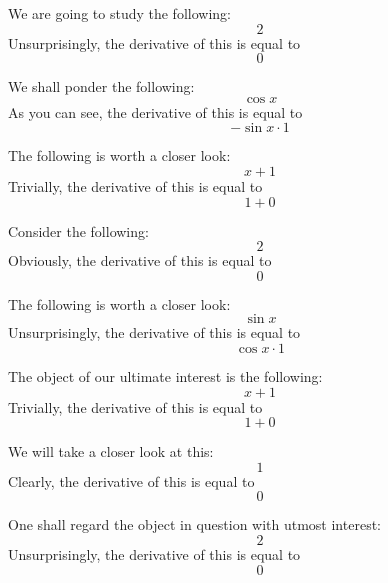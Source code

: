 \documentclass{article}
\begin{document}
We are going to study the following:
\begin{equation}
2 
\end{equation}
Unsurprisingly, the derivative of this is equal to
\begin{equation}
0 
\end{equation}

We shall ponder the following:
\begin{equation}
\cos x 
\end{equation}
As you can see, the derivative of this is equal to
\begin{equation}
-\sin x \cdot 1 
\end{equation}

The following is worth a closer look:
\begin{equation}
x + 1 
\end{equation}
Trivially, the derivative of this is equal to
\begin{equation}
1 + 0 
\end{equation}

Consider the following:
\begin{equation}
2 
\end{equation}
Obviously, the derivative of this is equal to
\begin{equation}
0 
\end{equation}

The following is worth a closer look:
\begin{equation}
\sin x 
\end{equation}
Unsurprisingly, the derivative of this is equal to
\begin{equation}
\cos x \cdot 1 
\end{equation}

The object of our ultimate interest is the following:
\begin{equation}
x + 1 
\end{equation}
Trivially, the derivative of this is equal to
\begin{equation}
1 + 0 
\end{equation}

We will take a closer look at this:
\begin{equation}
1 
\end{equation}
Clearly, the derivative of this is equal to
\begin{equation}
0 
\end{equation}

One shall regard the object in question with utmost interest:
\begin{equation}
2 
\end{equation}
Unsurprisingly, the derivative of this is equal to
\begin{equation}
0 
\end{equation}
\end{document}
